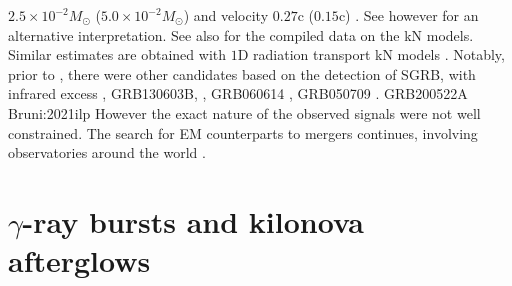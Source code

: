 $2.5\times10^{-2}M_{\odot}$ ($5.0\times10^{-2}M_{\odot}$) and velocity $0.27$c ($0.15$c)
\citep{Cowperthwaite:2017dyu,Villar:2017wcc}. 
See however \citep{Waxman:2017sqv} for an alternative interpretation.
See also \citep{Siegel:2019mlp} for the compiled data on the \ac{kN} models.
%
Similar estimates are obtained with $1$D radiation transport \ac{kN} models
\citep{Tanvir:2017pws,Tanaka:2017qxj}.
%
% 
Notably, prior to \AT{}, there were other candidates based on the detection of \ac{SGRB}, 
with infrared excess \eg, 
GRB130603B, \citep{Berger:2013wna,Tanvir:2013pia}, 
GRB060614 \citep{Jin:2015txa,Yang:2015pha}, 
GRB050709 \citep{Jin:2016pnm}.
GRB200522A \citep{WRONG}  Bruni:2021ilp
However the exact nature of the observed signals were not well constrained. 
%
The search for \ac{EM} counterparts to mergers continues, involving observatories around the world 
\citep{Law:2009,Singer:2014qca,Bellm:2014,Kasliwal:2016uhu}.
%




\section{$\gamma$-ray bursts and kilonova afterglows}

